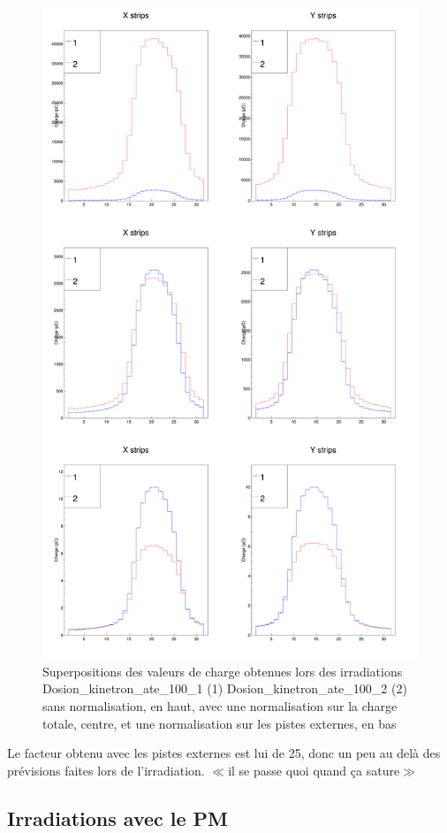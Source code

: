 \documentclass[a4paper,11pt]{article}
\begin{document}
\begin{figure}[h]
\begin{center}
\includegraphics[width=0.8\linewidth]{Ratio_1_2_nn.png} 
\caption{\label{fig:ratio}\footnotesize{Superpositions des valeurs de charge obtenues lors des irradiations Dosion\_kinetron\_ate\_100\_1 (1) Dosion\_kinetron\_ate\_100\_2 (2) sans normalisation, en haut, avec une normalisation sur la charge totale, centre, et une normalisation sur les pistes externes, en bas}}
\end{center}
\end{figure}
Le facteur obtenu avec les pistes externes est lui de 25, donc un peu au delà des prévisions faites lors de l'irradiation. 
$\ll$il se passe quoi quand ça sature$\gg$
\newpage
\subsection*{Irradiations avec le PM}
\end{document}
